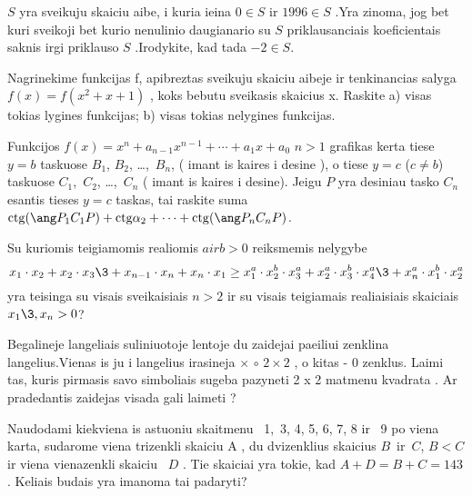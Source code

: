 \prob  %
    $S$ yra sveikuju skaiciu aibe, i kuria ieina  $0 \in S$ ir $1996
\in S$ .Yra zinoma, jog bet kuri sveikoji bet kurio nenulinio
daugianario su $S$ priklausanciais koeficientais saknis irgi priklauso
$S$ .Irodykite, kad tada $-2 \in S.$





\prob %
 Nagrinekime funkcijas f, apibreztas sveikuju skaiciu aibeje ir
 tenkinancias salyga
                 $f(x)=f(x^2+x+1)$ ,
 koks bebutu sveikasis skaicius x. Raskite 
            a) visas tokias lygines funkcijas;
            b) visas tokias nelygines funkcijas.
                                                                            
     



\prob  %
 Funkcijos  $f(x)=x^n+a_{n-1}x^{n-1}+\cdots+a_1x+a_0$      
$n>1$  grafikas kerta tiese $y=b$ taskuose $B_1$, $B_2$, \dots,~$B_n$,
 ( imant is kaires i desine ), o tiese $y=c$ ($c\ne b$) taskuose
  $C_1$,~$C_2$, \dots,~$C_n$ ( imant is kaires i desine).     
 Jeigu  $P$  yra desiniau tasko $C_n$ esantis tieses  $y=c$ taskas,
tai raskite suma
        $\ctg(\ang P_1C_1P)+\ctg\alpha_2+\cdots+\ctg(\ang P_nC_nP)$.




\prob   %
  Su kuriomis teigiamomis realiomis $a ir b>0$ reiksmemis nelygybe 
   $$x_1\cdot x_2+x_2\cdot x_3\3+x_{n-1}\cdot x_n+x_n\cdot x_1
    \ge x_1^a\cdot x_2^b\cdot x_3^a+x_2^a\cdot x_3^b\cdot 
        x_4^a\3+x_n^a\cdot x_1^b\cdot x_2^a$$
  yra teisinga su visais sveikaisiais $n>2$ ir su visais teigiamais
realiaisiais  skaiciais $x_1\3,x_n>0$?



\prob %
 Begalineje langeliais suliniuotoje lentoje du zaidejai
 paeiliui zenklina langelius.Vienas is ju i langelius irasineja                                                                                $\times$            $\circ$              
 $2\times 2$ , o kitas  - 0 zenklus. Laimi tas, kuris pirmasis savo
simboliais sugeba pazyneti 2 x 2 matmenu kvadrata . Ar pradedantis
zaidejas visada gali laimeti ? 


                                                
\prob %
Naudodami kiekviena  is astuoniu skaitmenu ~1,~3, 4, 5, 6, 7, 8 ir ~9
po viena karta, sudarome viena trizenkli skaiciu A , du dvizenklius
skaicius $B$~ir~$C$, $B<C$ ir viena vienazenkli skaiciu ~$D$ .
Tie skaiciai yra tokie, kad  $A+D=B+C=143$. Keliais budais yra imanoma
tai padaryti?




